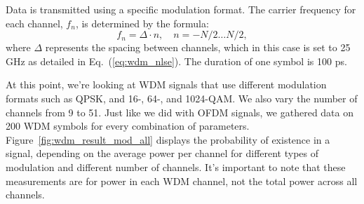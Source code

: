 Data is transmitted using a specific modulation format. The carrier frequency for each channel, \(f_n\), is determined by the formula:
\begin{equation}
    f_n = \Delta \cdot n, \quad n = -N/2 \ldots N/2,
\end{equation}
where \( \Delta \) represents the spacing between channels, which in this case is set to 25 GHz as detailed in Eq.~(\ref{eq:wdm_nlse}). The duration of one symbol is 100 ps.


At this point, we're looking at WDM signals that use different modulation formats such as QPSK, and 16-, 64-, and 1024-QAM. We also vary the number of channels from 9 to 51. Just like we did with OFDM signals, we gathered data on 200 WDM symbols for every combination of parameters. Figure~\ref{fig:wdm_result_mod_all} displays the probability of existence in a signal, depending on the average power per channel for different types of modulation and different number of channels. It's important to note that these measurements are for power in each WDM channel, not the total power across all channels.

